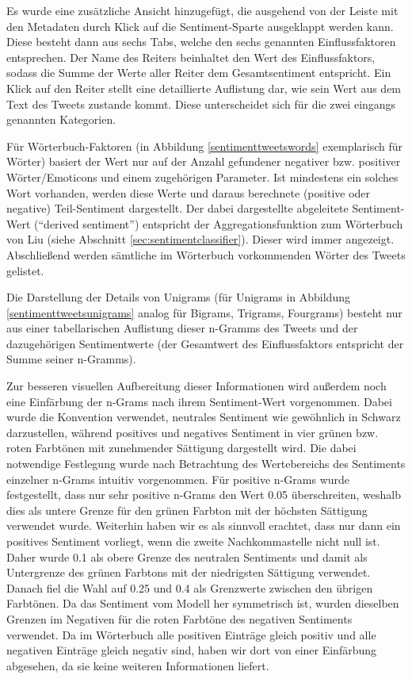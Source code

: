 Es wurde eine zusätzliche Ansicht hinzugefügt, die ausgehend von der Leiste mit den Metadaten durch Klick auf die Sentiment-Sparte ausgeklappt werden kann. Diese besteht dann aus sechs Tabs, welche den sechs genannten Einflussfaktoren entsprechen. Der Name des Reiters beinhaltet den Wert des Einflussfaktors, sodass die Summe der Werte aller Reiter dem Gesamtsentiment entspricht. Ein Klick auf den Reiter stellt eine detaillierte Auflistung dar, wie sein Wert aus dem Text des Tweets zustande kommt. Diese unterscheidet sich für die zwei eingangs genannten Kategorien.

Für Wörterbuch-Faktoren (in Abbildung \ref{sentimenttweetswords} exemplarisch für Wörter) basiert der Wert nur auf der Anzahl gefundener negativer bzw. positiver Wörter/Emoticons und einem zugehörigen Parameter. Ist mindestens ein solches Wort vorhanden, werden diese Werte und daraus berechnete (positive oder negative) Teil-Sentiment dargestellt. Der dabei dargestellte abgeleitete Sentiment-Wert ("`derived sentiment"') entspricht der Aggregationsfunktion zum Wörterbuch von Liu (siehe Abschnitt \ref{sec:sentimentclassifier}). Dieser wird immer angezeigt. Abschließend werden sämtliche im Wörterbuch vorkommenden Wörter des Tweets gelistet.

Die Darstellung der Details von Unigrams (für Unigrams in Abbildung \ref{sentimenttweetsunigrams} analog für Bigrams, Trigrams, Fourgrams) besteht nur aus einer tabellarischen Auflistung dieser n-Gramms des Tweets und der dazugehörigen Sentimentwerte (der Gesamtwert des Einflussfaktors entspricht der Summe seiner n-Gramms).

Zur besseren visuellen Aufbereitung dieser Informationen wird außerdem noch eine Einfärbung der n-Grams nach ihrem Sentiment-Wert vorgenommen. Dabei wurde die Konvention verwendet, neutrales Sentiment wie gewöhnlich in Schwarz darzustellen, während positives und negatives Sentiment in vier grünen bzw. roten Farbtönen mit zunehmender Sättigung dargestellt wird. Die dabei notwendige Festlegung wurde nach Betrachtung des Wertebereichs des Sentiments einzelner n-Grams intuitiv vorgenommen. Für positive n-Grams wurde festgestellt, dass nur sehr positive n-Grams den Wert 0.05 überschreiten, weshalb dies als untere Grenze für den grünen Farbton mit der höchsten Sättigung verwendet wurde. Weiterhin haben wir es als sinnvoll erachtet, dass nur dann ein positives Sentiment vorliegt, wenn die zweite Nachkommastelle nicht null ist. Daher wurde 0.1 als obere Grenze des neutralen Sentiments und damit als Untergrenze des grünen Farbtons mit der niedrigsten Sättigung verwendet. Danach fiel die Wahl auf 0.25 und 0.4 als Grenzwerte zwischen den übrigen Farbtönen. Da das Sentiment vom Modell her symmetrisch ist, wurden dieselben Grenzen im Negativen für die roten Farbtöne des negativen Sentiments verwendet. Da im Wörterbuch alle positiven Einträge gleich positiv und alle negativen Einträge gleich negativ sind, haben wir dort von einer Einfärbung abgesehen, da sie keine weiteren Informationen liefert.

